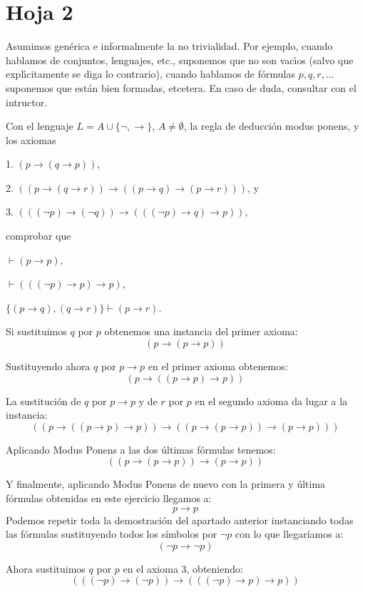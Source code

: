 \section{Hoja 2}

Asumimos gen\'erica e informalmente la no trivialidad. Por ejemplo,
cuando hablamos de conjuntos, lenguajes, etc., suponemos que no  son vac\'{\i}os (salvo que
expl\'{\i}citamente
se diga lo contrario),  cuando hablamos de f\'ormulas $p, q, r, \dots$
suponemos que est\'an bien formadas, etcetera.
En caso de duda, consultar con el intructor.

\begin{problem}[1]
Con el lenguaje $L = A \cup \{\neg, \to\}$, $A \ne \emptyset$, la regla de deducci\'on modus ponens,
y los axiomas

1.  $ (p\to (q\to p))$,

2. $( (p\to (q\to r)) \to  ( (p\to q) \to (p\to r)))$, y

3. $(( (\neg p) \to (\neg q)) \to  ( ((\neg p) \to q) \to p))$,

comprobar que

\ppart $\vdash (p\to p)$,

\ppart $\vdash ((( \neg p) \to p)\to p)$,

\ppart  $\{(p\to q), (q\to r)\} \vdash (p\to r)$.
\solution

\spart
Si sustituimos $q$ por $p$ obtenemos una instancia del primer axioma:
\[(p \to ( p \to p ))\]

Sustituyendo ahora $q$ por $p \to p$ en el primer axioma obtenemos:
\[(p \to (( p \to p) \to p))\]

La sustitución de $q$ por $p \to p$ y de $r$ por $p$ en el segundo axioma da lugar a la instancia:
\[((p \to (( p \to p ) \to p )) \to ((p \to (p \to p)) \to (p \to p)))\]

Aplicando Modus Ponens a las dos últimas fórmulas tenemos:
\[((p \to (p \to p)) \to (p \to p))\]

Y finalmente, aplicando Modus Ponens de nuevo con la primera y última fórmulas obtenidas en este ejercicio llegamos a:
\[p \to p\]
\spart
Podemos repetir toda la demostración del apartado anterior instanciando todas las fórmulas sustituyendo todos los símbolos por $\neg p$ con lo que llegaríamos a:
\[ (\neg p \to \neg p)\]

Ahora sustituimos $q$ por $p$ en el axioma 3, obteniendo:
\[ (( (\neg p) \to (\neg p)) \to  ( ((\neg p) \to p) \to p))\]


\end{problem}
